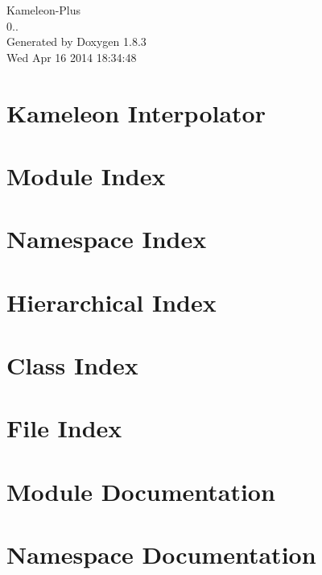 \documentclass{book}
\begin{document}
\hypersetup{pageanchor=false,citecolor=blue}
\begin{titlepage}
\vspace*{7cm}
\begin{center}
{\Large Kameleon-\/\-Plus \\[1ex]\large 0.. }\\
\vspace*{1cm}
{\large Generated by Doxygen 1.8.3}\\
\vspace*{0.5cm}
{\small Wed Apr 16 2014 18:34:48}\\
\end{center}
\end{titlepage}
\clearemptydoublepage
{}
\tableofcontents
\clearemptydoublepage
{}
\hypersetup{pageanchor=true,citecolor=blue}
\chapter{Kameleon Interpolator}
\label{index}\hypertarget{index}{}
\chapter{Module Index}

\chapter{Namespace Index}

\chapter{Hierarchical Index}

\chapter{Class Index}

\chapter{File Index}

\chapter{Module Documentation}







\chapter{Namespace Documentation}











\end{document}

